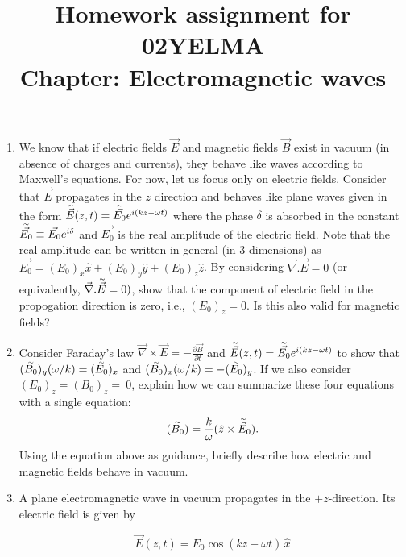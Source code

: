 \documentclass[12pt]{article}
\title{Homework assignment for 02YELMA \\ Chapter: Electromagnetic waves}
\begin{document}
\date{}
\maketitle
\vspace{-0.8in}

\begin{enumerate}

    \item We know that if electric fields $\vec{E}$ and magnetic fields $\vec{B}$ exist in vacuum (in absence of charges and currents), they behave like waves according to Maxwell's equations. For now, let us focus only on electric fields. Consider that $\vec{E}$ propagates in the $z$ direction and behaves like plane waves given in the form $\accentset{\sim}{\vec{E}}(z,t)=\accentset{\sim}{\vec{E_0}}e^{i(kz-\omega t)}$ where the phase $\delta$ is absorbed in the constant $\accentset{\sim}{\vec{E_0}}\equiv \vec{E_0}e^{i\delta}$ and $\vec{E_0}$ is the real amplitude of the electric field. Note that the real amplitude can be written in general (in 3 dimensions) as $\vec{E_0}= (E_0)_x\hat{x}+(E_0)_y\hat{y}+(E_0)_z\hat{z}$. By considering $\vec{\nabla}.\vec{E}=0$ (or equivalently, $\vec{\nabla}.\accentset{\sim}{\vec{E}}=0)$, show that the component of electric field in the propogation direction is zero, i.e., $(E_0)_z=0$. Is this also valid for magnetic fields? 

    \item Consider Faraday's law $\vec{\nabla}\times\vec{E}=-\frac{\partial{\vec{B}}}{\partial{t}}$ and $\accentset{\sim}{\vec{E}}(z,t)=\accentset{\sim}{\vec{E_0}}e^{i(kz-\omega t)}$ to show that $(\accentset{\sim}{B_0})_y(\omega/k)=(\accentset{\sim}{E_0})_x$ and $(\accentset{\sim}{B_0})_x(\omega/k)=-(\accentset{\sim}{E_0})_y$. If we also consider $(E_0)_z=(B_0)_z=~0$, explain how we can summarize these four equations with a single equation:
    \begin{equation*}
    (\accentset{\sim}{B_0})=\frac{k}{\omega}(\hat{z}\times \accentset{\sim}{\vec{E}}_0).
    \end{equation*}
    Using the equation above as guidance, briefly describe how electric and magnetic fields behave in vacuum.



    \item A plane electromagnetic wave in vacuum propagates in the $+z$-direction. Its electric field is given by

\[
\vec{E}(z,t)=E_0\cos(kz-\omega t)\,\hat{x}
\]


\end{enumerate}
\end{document}
